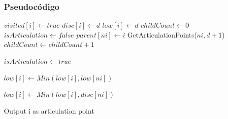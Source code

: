 \subsubsection{Pseudocódigo}
\begin{algorithm}[H]
	\begin{algorithmic}[1]
			\State $visited[i] \leftarrow true$
			\State $disc[i] \leftarrow d$
			\State $low[i] \leftarrow d$
			\State $childCount \leftarrow 0$
			\State $isArticulation \leftarrow false$
					\State $parent[ni] \leftarrow i$
					\State GetArticulationPoints($ni, d + 1$)
					\State $childCount \leftarrow childCount + 1$
					
						\State $isArticulation \leftarrow true$
					\EndIf
					
					\State $low[i] \leftarrow Min(low[i], low[ni])$
					
					\State $low[i] \leftarrow Min(low[i], disc[ni])$
				\EndIf
			\EndFor
			
				\State 
				\Return Output i as articulation point
			\EndIf
		\EndFunction
	\end{algorithmic}
\end{algorithm}

